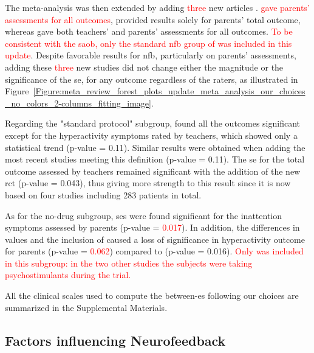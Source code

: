 The meta-analysis was then extended by adding \textcolor{red}{three} new articles \citep{Strehl2017, Baumeister2016, Bazanova2018}. 
\citet{Bazanova2018} \textcolor{red}{gave parents' assessments for all outcomes}, \citet{Baumeister2016} provided results solely for parents' 
total outcome, whereas \citet{Strehl2017} gave both teachers' and parents' assessments for all outcomes. \textcolor{red}{To be consistent 
with the \gls{saob}, only the standard \gls{nfb} group of }\citet{Bazanova2018} \textcolor{red}{was included in this update}. Despite favorable results 
for \gls{nfb}, particularly on parents' assessments, adding these \textcolor{red}{three} new studies did not change either the magnitude or the significance 
of the \gls{se}, for any outcome regardless of the raters, as illustrated in 
Figure~\ref{Figure:meta_review_forest_plots_update_meta_analysis_our_choices_no_colors_2-columns_fitting_image}. 

Regarding the "standard protocol" subgroup, \citet{Cortese2016} found all the outcomes significant except for the 
hyperactivity symptoms rated by teachers, which showed only a statistical trend (p-value = 0.11). Similar results 
were obtained when adding the most recent studies meeting this definition \citep{Strehl2017, Baumeister2016} (p-value = 0.11). 
The \gls{se} for the total outcome assessed by teachers remained significant with the addition of the new
\gls{rct} (p-value = 0.043), thus giving more strength to this result since it is now based on four studies including 283
patients in total.

As for the no-drug subgroup, \glspl{se} were found significant for the inattention symptoms assessed by parents (p-value = \textcolor{red}{0.017}). 
In addition, the differences in \citet{Arnold2014} values and the inclusion of \citet{Bazanova2018} caused a 
loss of significance in hyperactivity outcome for parents (p-value = \textcolor{red}{0.062}) compared to \citet{Cortese2016} 
(p-value = 0.016). \textcolor{red}{Only} \citet{Bazanova2018} \textcolor{red}{was included in this subgroup: in the two other 
studies the subjects were taking psychostimulants during the trial.}

All the clinical scales used to compute the between-\gls{es} following our choices are summarized in the Supplemental Materials.

\subsection{Factors influencing Neurofeedback}

